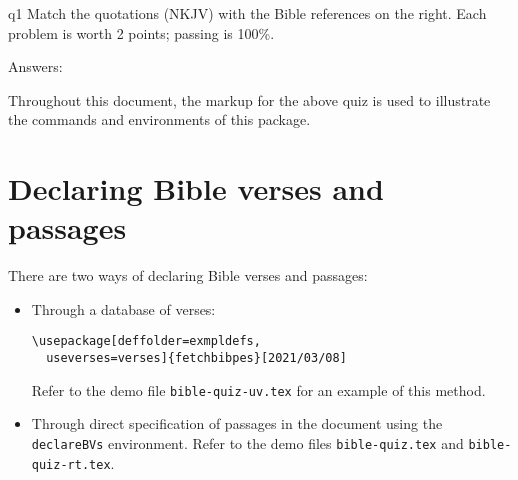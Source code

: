 \documentclass{article}
\let\env\texttt
\begin{document}
\begin{quiz}{q1}
Match the quotations (\textsf{NKJV)} with the Bible references on the right.
Each problem is worth 2 points; passing is 100\%.

\noindent
\begin{minipage}[t]{.75\linewidth} %
\begin{questions}
\begin{BblPsg}
  \item{}
  \item{}
  \item{}
\end{BblPsg}
\end{questions}
\end{minipage}%
\hfill
\begin{minipage}[t][0pt]{.25\linewidth-1em} %
\begin{questions}[itemsep={0pt},labelwidth={.5em}]
\begin{BblVrs}
  \item{}
  \item{}
  \item{}
  \item{}
  \item{}
  \item{}
\end{BblVrs}
\end{questions}
\end{minipage}\hfill
\par\medskip
\end{quiz}\quad\PointsField\currQuiz\olBdry\CorrButton\currQuiz\cgBdry[6pt]
Answers: 

\noindent
Throughout this document, the markup for the above quiz is used to illustrate
the commands and environments of this package.

\section{Declaring Bible verses and passages}

There are two ways of declaring Bible verses and passages:
\begin{itemize}
\item Through a database of verses:
\begin{Verbatim}
\usepackage[deffolder=exmpldefs,
  useverses=verses]{fetchbibpes}[2021/03/08]
\end{Verbatim}
  Refer to the demo file \texttt{bible-quiz-uv.tex} for an example of this
  method.
\item Through direct specification of passages in the document using the
  \env{declareBVs} environment. Refer to the demo files \texttt{bible-quiz.tex} and
  \texttt{bible-quiz-rt.tex}.
\end{itemize}
\end{document}

